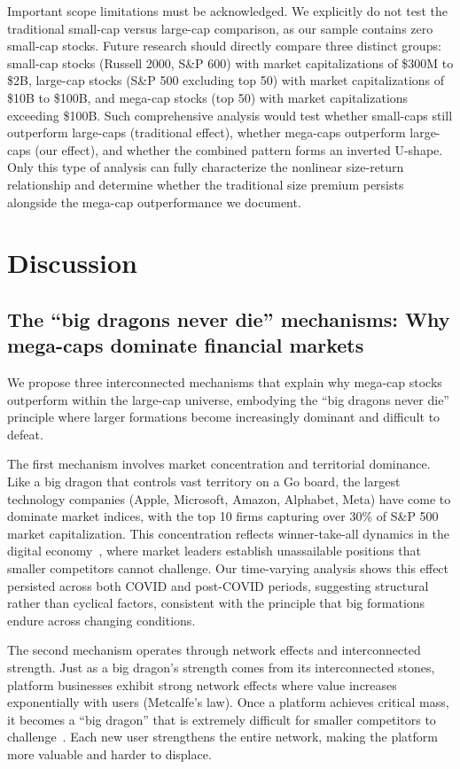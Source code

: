 \documentclass[10pt,letterpaper]{article}
\begin{document}
Important scope limitations must be acknowledged. We explicitly do not test the traditional small-cap versus large-cap comparison, as our sample contains zero small-cap stocks. Future research should directly compare three distinct groups: small-cap stocks (Russell 2000, S\&P 600) with market capitalizations of \$300M to \$2B, large-cap stocks (S\&P 500 excluding top 50) with market capitalizations of \$10B to \$100B, and mega-cap stocks (top 50) with market capitalizations exceeding \$100B. Such comprehensive analysis would test whether small-caps still outperform large-caps (traditional effect), whether mega-caps outperform large-caps (our effect), and whether the combined pattern forms an inverted U-shape. Only this type of analysis can fully characterize the nonlinear size-return relationship and determine whether the traditional size premium persists alongside the mega-cap outperformance we document.

\section*{Discussion}

\subsection*{The ``big dragons never die'' mechanisms: Why mega-caps dominate financial markets}

We propose three interconnected mechanisms that explain why mega-cap stocks outperform within the large-cap universe, embodying the ``big dragons never die'' principle where larger formations become increasingly dominant and difficult to defeat.

The first mechanism involves market concentration and territorial dominance. Like a big dragon that controls vast territory on a Go board, the largest technology companies (Apple, Microsoft, Amazon, Alphabet, Meta) have come to dominate market indices, with the top 10 firms capturing over 30\% of S\&P 500 market capitalization. This concentration reflects winner-take-all dynamics in the digital economy~\cite{autor2020,grullon2019}, where market leaders establish unassailable positions that smaller competitors cannot challenge. Our time-varying analysis shows this effect persisted across both COVID and post-COVID periods, suggesting structural rather than cyclical factors, consistent with the principle that big formations endure across changing conditions.

The second mechanism operates through network effects and interconnected strength. Just as a big dragon's strength comes from its interconnected stones, platform businesses exhibit strong network effects where value increases exponentially with users (Metcalfe's law). Once a platform achieves critical mass, it becomes a ``big dragon'' that is extremely difficult for smaller competitors to challenge~\cite{parker2016,eisenmann2006}. Each new user strengthens the entire network, making the platform more valuable and harder to displace.
\end{document}
